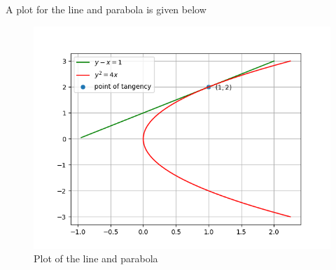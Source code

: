 \documentclass[journal,12pt,twocolumn]{IEEEtran}
\begin{document}
A plot for the line and parabola is given below
\begin{figure}[!ht]
    \centering
    \includegraphics[width=\columnwidth]{plot/figure_1}
    \caption{Plot of the line and parabola}
    \label{plot}
\end{figure}
\end{document}
